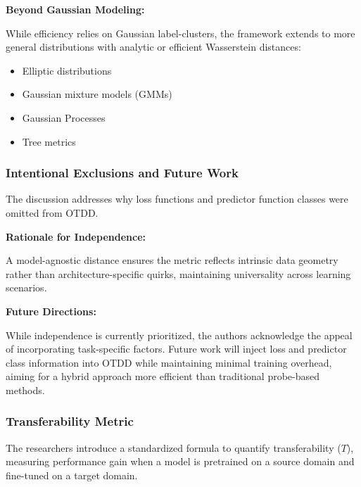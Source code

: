 \documentclass[11pt, a4paper]{article}
\theoremstyle{plain} %
\theoremstyle{definition} %
\begin{document}
				\textbf{Beyond Gaussian Modeling:}

				While efficiency relies on Gaussian label-clusters, the framework extends to more general distributions with analytic or efficient Wasserstein distances:
				\begin{itemize}
					\item Elliptic distributions
					\item Gaussian mixture models (GMMs)
					\item Gaussian Processes
					\item Tree metrics
				\end{itemize}

			\subsubsection{Intentional Exclusions and Future Work}
			\label{sec:exclusions_and_future}
				The discussion addresses why loss functions and predictor function classes were omitted from OTDD.

				\textbf{Rationale for Independence:}

				A model-agnostic distance ensures the metric reflects intrinsic data geometry rather than architecture-specific quirks, maintaining universality across learning scenarios.

				\textbf{Future Directions:}

				While independence is currently prioritized, the authors acknowledge the appeal of incorporating task-specific factors. Future work will inject loss and predictor class information into OTDD while maintaining minimal training overhead, aiming for a hybrid approach more efficient than traditional probe-based methods.

			\subsubsection{Transferability Metric}
			\label{sec:transferability_metric}
				The researchers introduce a standardized formula to quantify transferability ($T$), measuring performance gain when a model is pretrained on a source domain and fine-tuned on a target domain.
\end{document}
